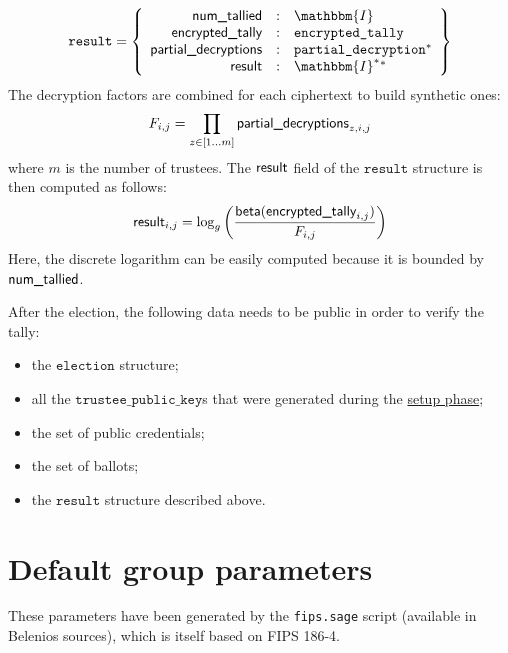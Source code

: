 \documentclass[a4paper]{article}
\newcommand{\I}{\mathbbm{I}}
\newcommand{\tpk}{\texttt{trustee\_public\_key}}
\newcommand{\election}{\texttt{election}}
\newcommand{\etally}{\texttt{encrypted\_tally}}
\newcommand{\pdecryption}{\texttt{partial\_decryption}}
\newcommand{\result}{\texttt{result}}
\begin{document}
\begin{gather*}
  \result=\left\{
    \begin{array}{rcl}
      \ntallied&:&\I\\
      \etallylabel&:&\etally\\
      \pdlabel&:&\pdecryption^\ast\\
      \resultlabel&:&\I^\ast{}^\ast
    \end{array}
  \right\}
\end{gather*}
The decryption factors are combined for each ciphertext to build
synthetic ones:
\[
F_{i,j}=\prod_{z\in[1\dots m]}\textsf{partial\_decryptions}_{z,i,j}
\]
where $m$ is the number of trustees. The $\textsf{result}$ field of the
$\result$ structure is then computed as follows:
\[
\textsf{result}_{i,j}=\log_g\left(\frac{\textsf{beta}(\textsf{encrypted\_tally}_{i,j})}{F_{i,j}}\right)
\]
Here, the discrete logarithm can be easily computed because it is
bounded by $\textsf{num\_tallied}$.

After the election, the following data needs to be public in order to
verify the tally:
\begin{itemize}
\item the $\election$ structure;
\item all the $\tpk$s that were generated during the
  \hyperref[election-setup]{setup phase};
\item the set of public credentials;
\item the set of ballots;
\item the $\result$ structure described above.
\end{itemize}

\section{Default group parameters}
\label{default-group}

These parameters have been generated by the \verb=fips.sage= script
(available in Belenios sources), which is itself based on FIPS 186-4.
\end{document}
